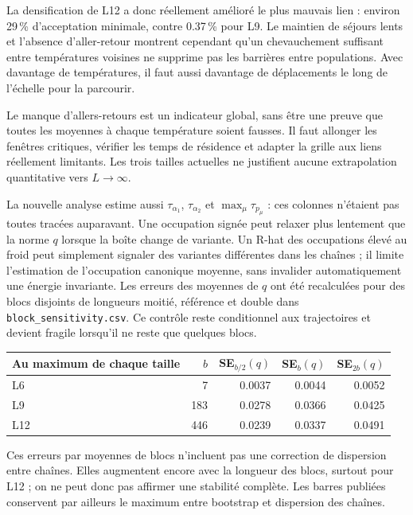 La densification de L12 a donc réellement amélioré le plus mauvais lien : environ 29\,\% d’acceptation minimale, contre 0.37\,\% pour L9. Le maintien de séjours lents et l’absence d’aller-retour montrent cependant qu’un chevauchement suffisant entre températures voisines ne supprime pas les barrières entre populations. Avec davantage de températures, il faut aussi davantage de déplacements le long de l’échelle pour la parcourir.

Le manque d’allers-retours est un indicateur global, sans être une preuve que toutes les moyennes à chaque température soient fausses. Il faut allonger les fenêtres critiques, vérifier les temps de résidence et adapter la grille aux liens réellement limitants. Les trois tailles actuelles ne justifient aucune extrapolation quantitative vers $L\to\infty$.

La nouvelle analyse estime aussi $\tau_{\alpha_1}$, $\tau_{\alpha_2}$ et $\max_\mu\tau_{p_\mu}$ : ces colonnes n’étaient pas toutes tracées auparavant. Une occupation signée peut relaxer plus lentement que la norme $q$ lorsque la boîte change de variante. Un R-hat des occupations élevé au froid peut simplement signaler des variantes différentes dans les chaînes ; il limite l’estimation de l’occupation canonique moyenne, sans invalider automatiquement une énergie invariante. Les erreurs des moyennes de $q$ ont été recalculées pour des blocs disjoints de longueurs moitié, référence et double dans \texttt{block\_sensitivity.csv}. Ce contrôle reste conditionnel aux trajectoires et devient fragile lorsqu’il ne reste que quelques blocs.

\begin{center}\small\begin{tabular}{lrrrr}\toprule

Au maximum de chaque taille & $b$ & SE$_{b/2}(q)$ & SE$_b(q)$ & SE$_{2b}(q)$\\\midrule

L6 & 7 & 0.0037 & 0.0044 & 0.0052\\

L9 & 183 & 0.0278 & 0.0366 & 0.0425\\

L12 & 446 & 0.0239 & 0.0337 & 0.0491\\

\bottomrule\end{tabular}\end{center}

Ces erreurs par moyennes de blocs n’incluent pas une correction de dispersion entre chaînes. Elles augmentent encore avec la longueur des blocs, surtout pour L12 ; on ne peut donc pas affirmer une stabilité complète. Les barres publiées conservent par ailleurs le maximum entre bootstrap et dispersion des chaînes.

